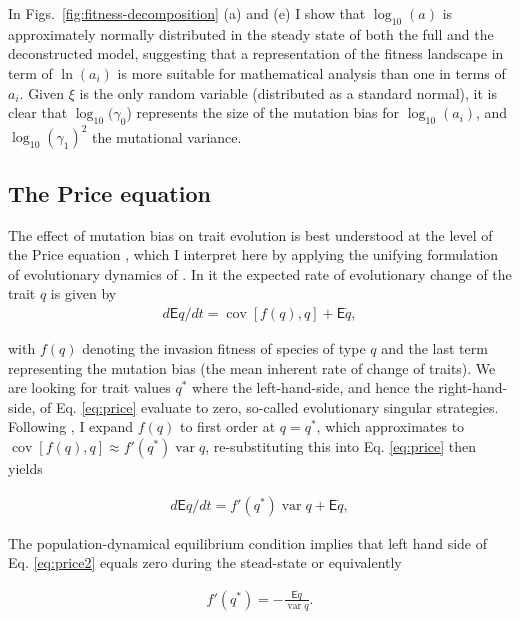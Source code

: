 \documentclass[a4paper]{report}
\DeclareMathOperator{\cov}{cov}
\DeclareMathOperator{\var}{var}
\DeclareMathOperator{\log}{log}
\begin{document}
In Figs.~\ref{fig:fitness-decomposition} (a) and (e) I show that
$\log_{10}(a)$ is approximately normally distributed in the steady state of
both the full and the deconstructed model, suggesting that a representation of the fitness landscape in term of $\ln(a_i)$ is more suitable for mathematical analysis than one in terms of $a_i$. Given $\xi$ is the only random variable (distributed as a standard normal), it is clear that $\log_{10}(\gamma_{0}$) represents the
size of the mutation bias for $\log_{10}(a_i)$, and $\log_{10}(\gamma_{1})^2$ the mutational
variance. \\

\subsection{The Price equation}

The effect of mutation bias on trait evolution is best understood at
the level of the Price equation \citep{Price72:_ExtensionCovariance},
which I interpret here by applying the unifying formulation of
evolutionary dynamics of \citep{Page2002}. In it the
expected rate of evolutionary change of the trait $q$ is given by
\begin{align}
  \label{eq:price}
  d \mathsf{E} q/dt = \cov[f(q),q] + \mathsf{E} \dot q,
\end{align}

with $f(q)$ denoting the invasion fitness of species of type $q$ and
the last term representing the mutation bias (the mean inherent rate
of change of traits). We are looking for trait values $q^*$ where the
left-hand-side, and hence the right-hand-side, of Eq. \eqref{eq:price}
evaluate to zero, so-called evolutionary singular strategies.
Following \citep{Page2002}, I expand $f(q)$ to first order at $q=q^*$, which approximates to $ \cov[f(q),q] \approx f'(q^*)\var q$, re-substituting this into Eq. \eqref{eq:price} then yields

\begin{align}
  \label{eq:price2}
  d \mathsf{E} q/dt = f'(q^*)\var q + \mathsf{E} \dot q,
\end{align}

The population-dynamical equilibrium condition implies that left hand side of Eq. \eqref{eq:price2} equals zero during the stead-state or equivalently

\begin{align}
  \label{eq:ess}
  f'(q^*) = - \frac{\mathsf{E} \dot q}{\var q}.
\end{align}
\end{document}
